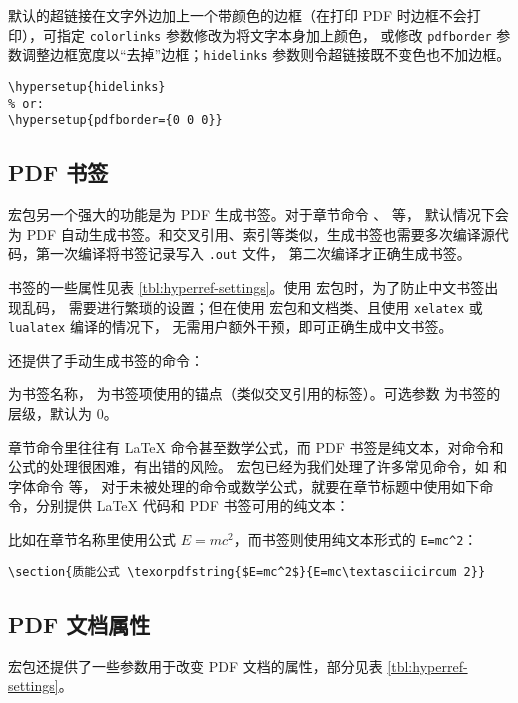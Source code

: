 默认的超链接在文字外边加上一个带颜色的边框（在打印 PDF 时边框不会打印），可指定 \texttt{color\-links} 参数修改为将文字本身加上颜色，
或修改 \texttt{pdf\-border} 参数调整边框宽度以“去掉”边框；\texttt{hide\-links} 参数则令超链接既不变色也不加边框。
\begin{verbatim}
\hypersetup{hidelinks}
% or:
\hypersetup{pdfborder={0 0 0}}
\end{verbatim}

\subsection{PDF 书签}\label{subsec:pdf-bookmark}

 宏包另一个强大的功能是为 PDF 生成书签。对于章节命令 、 等，
默认情况下会为 PDF 自动生成书签。和交叉引用、索引等类似，生成书签也需要多次编译源代码，第一次编译将书签记录写入 \texttt{.out} 文件，
第二次编译才正确生成书签。

书签的一些属性见表 \ref{tbl:hyperref-settings}。使用  宏包时，为了防止中文书签出现乱码，
需要进行繁琐的设置；但在使用  宏包和文档类、且使用 \texttt{xelatex} 或 \texttt{lualatex} 编译的情况下，
无需用户额外干预，即可正确生成中文书签。

 还提供了手动生成书签的命令：
\begin{command}
\end{command}
 为书签名称， 为书签项使用的锚点（类似交叉引用的标签）。可选参数  为书签的层级，默认为 0。

章节命令里往往有 \LaTeX{} 命令甚至数学公式，而 PDF 书签是纯文本，对命令和公式的处理很困难，有出错的风险。
 宏包已经为我们处理了许多常见命令，如  和字体命令  等，
对于未被处理的命令或数学公式，就要在章节标题中使用如下命令，分别提供 \LaTeX{} 代码和 PDF 书签可用的纯文本：
\begin{command}
\end{command}
比如在章节名称里使用公式 $E=mc^2$，而书签则使用纯文本形式的 \verb|E=mc^2|：
\begin{verbatim}
\section{质能公式 \texorpdfstring{$E=mc^2$}{E=mc\textasciicircum 2}}
\end{verbatim}

\subsection{PDF 文档属性}\label{subsec:pdf-settings}

 宏包还提供了一些参数用于改变 PDF 文档的属性，部分见表 \ref{tbl:hyperref-settings}。


\endinput

